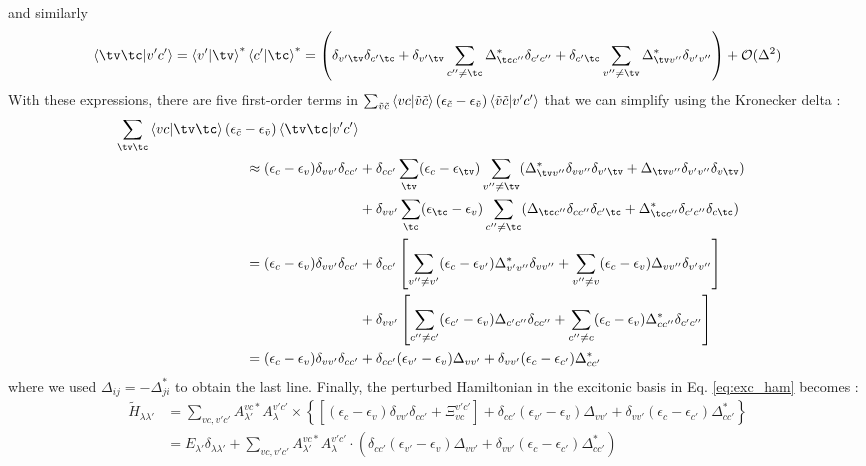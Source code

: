 and similarly
\begin{equation}
    \bra{\tv\tc}\ket{v'c'} = \bra{v'}\ket{\tv}^*\bra{c'}\ket{\tc}^* = \left( \delta_{v'\tv}\delta_{c'\tc} + \delta_{v'\tv} \sum_{c''\neq\tc} \Delta^*_{\tc c''}\delta_{c'c''} + \delta_{c'\tc}\sum_{v''\neq \tv} \Delta^*_{\tv v''} \delta_{v'v''}  \right)  + \mathcal{O}(\Delta^2)
\end{equation}
With these expressions, there are five first-order terms in $\sum_{\Tilde{v}\tilde{c}} \bra{vc}\ket{\Tilde{v}\Tilde{c}} (\epsilon_{\Tilde{c}} - \epsilon_{\Tilde{v}})\bra{\Tilde{v}\Tilde{c}}\ket{v'c'}$ that we can simplify using the Kronecker delta :
\begin{align}
    \sum_{\tv\tc} \bra{vc}\ket{\tv\tc} (\epsilon_{\Tilde{c}} - \epsilon_{\Tilde{v}})\bra{\tv\tc}\ket{v'c'} \nonumber \\
        \approx (\epsilon_c - \epsilon_v)\delta_{vv'}\delta_{cc'} &+ \delta_{cc'}\sum_{\tv}(\epsilon_c - \epsilon_{\tv}) \sum_{v''\neq \tv} (\Delta^*_{\tv v''}\delta_{vv''}\delta_{v'\tv} + \Delta_{\tv v''}\delta_{v'v''}\delta_{v\tv}) \nonumber \\
        &+  \delta_{vv'} \sum_{\tc} (\epsilon_{\tc} - \epsilon_v) \sum_{c'' \neq\tc} (\Delta_{\tc c''}\delta_{cc''}\delta_{c'\tc} + \Delta^*_{\tc c''}\delta_{c'c''}\delta_{c\tc}) \nonumber \\
        = (\epsilon_c - \epsilon_v)\delta_{vv'}\delta_{cc'} &+ \delta_{cc'} \left[  \sum_{v''\neq v'} (\epsilon_c - \epsilon_{v'}) \Delta^*_{v'v''}\delta_{v v''} + \sum_{v'' \neq v} (\epsilon_c - \epsilon_v) \Delta_{vv''} \delta_{v'v''} \right] \nonumber \\
        &+  \delta_{vv'} \left[ \sum_{c''\neq c'} (\epsilon_{c'} - \epsilon_v)\Delta_{c' c''}\delta_{cc''} + \sum_{c''\neq c} (\epsilon_c - \epsilon_v) \Delta^*_{cc''}\delta_{c'c''} \right] \nonumber \\
    = (\epsilon_c - \epsilon_v) \delta_{vv'}\delta_{cc'} &+ \delta_{cc'}(\epsilon_{v'} - \epsilon_v) \Delta_{vv'} + \delta_{vv'}(\epsilon_c - \epsilon_{c'}) \Delta^*_{cc'}
\end{align}
where we used $\Delta_{ij} = -\Delta_{ji}^*$ to obtain the last line. Finally, the perturbed Hamiltonian in the excitonic basis in Eq. \eqref{eq:exc_ham} becomes :
\begin{align}
    \tilde{H}_{\lambda\lambda'} &= \sum_{vc,v'c'} A_{\lambda'}^{vc*} A_{\lambda}^{v'c'} \times \left\{ \left[ (\epsilon_c - \epsilon_v) \delta_{vv'}\delta_{cc'} + \Xi_{vc}^{v'c'} \right] + \delta_{cc'} (\epsilon_{v'} - \epsilon_v)\Delta_{vv'} + \delta_{vv'}(\epsilon_c - \epsilon_{c'}) \Delta_{cc'}^*  \right\} \nonumber \\
    &= E_{\lambda'}\delta_{\lambda\lambda'} + \sum_{vc,v'c'} A_{\lambda'}^{vc*} A_{\lambda}^{v'c'} \cdot \left( \delta_{cc'}(\epsilon_{v'} - \epsilon_v) \Delta_{vv'}  + \delta_{vv'} (\epsilon_c - \epsilon_{c'}) \Delta^*_{cc'} \right) \label{eq:perturb_H_exc}
\end{align}
